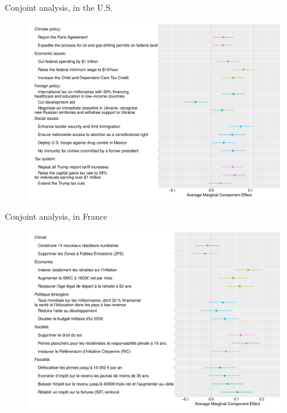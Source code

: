 \documentclass[aspectratio=169,xcolor=dvipsnames, 11pt,mathserif]{beamer}
\begin{document}
\begin{frame}{Conjoint analysis,  in the U.S.\label{conjoint_countries} \hyperlink{conjoint_country}{}} 
    \begin{figure} \vspace{-.14cm}
\includegraphics[height=.97\textheight]{../figures/all/conjoint_EN.pdf}
\end{figure}
\end{frame}

\begin{frame}{Conjoint analysis,  in France\label{conjoint_countries} \hyperlink{conjoint_country}{}} 
    \begin{figure} \vspace{-.14cm}
\includegraphics[height=.97\textheight]{../figures/all/conjoint_FR.pdf}
\end{figure}
\end{frame}
\end{document}
